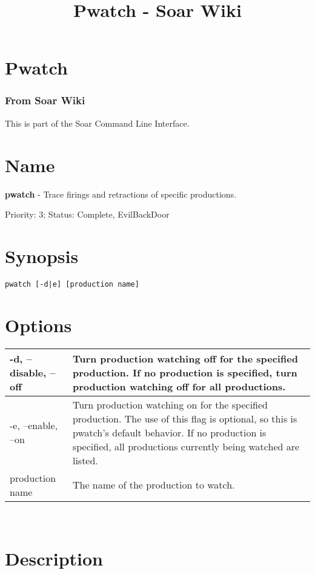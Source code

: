 \documentclass[10pt]{article}
\title{Pwatch - Soar Wiki}
\begin{document}
\section*{Pwatch}
\subsubsection*{From Soar Wiki}


 This is part of the Soar Command Line Interface. 
\section*{ Name }


 \textbf{pwatch}
 - Trace firings and retractions of specific productions. 


 Priority: 3; Status: Complete, EvilBackDoor
\section*{ Synopsis }
\begin{verbatim}
pwatch [-d|e] [production name]

\end{verbatim}
\section*{ Options }


\begin{tabular}{|p{1in}|p{5in}|}
\hline 
 -d, --disable, --off  & Turn production watching off for the specified production. If no production is specified, turn production watching off for all productions.  \\
 \hline 
 -e, --enable, --on  & Turn production watching on for the specified production. The use of this flag is optional, so this is pwatch's default behavior. If no production is specified, all productions currently being watched are listed.  \\
 \hline 
production name & The name of the production to watch.  \\
 \hline 

\end{tabular}



 \\ 

\section*{ Description }
\end{document}

